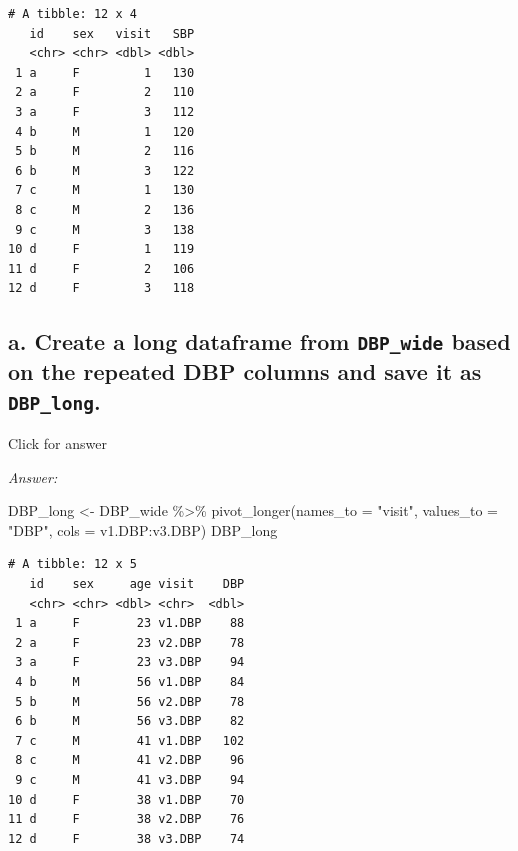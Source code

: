 \documentclass[
]{book}
\newenvironment{Shaded}{\begin{snugshade}}{\end{snugshade}}
\newcommand{\AttributeTok}[1]{\textcolor[rgb]{0.77,0.63,0.00}{#1}}
\newcommand{\FunctionTok}[1]{\textcolor[rgb]{0.00,0.00,0.00}{#1}}
\newcommand{\NormalTok}[1]{#1}
\newcommand{\OtherTok}[1]{\textcolor[rgb]{0.56,0.35,0.01}{#1}}
\newcommand{\SpecialCharTok}[1]{\textcolor[rgb]{0.00,0.00,0.00}{#1}}
\newcommand{\StringTok}[1]{\textcolor[rgb]{0.31,0.60,0.02}{#1}}
\begin{document}
\begin{verbatim}
# A tibble: 12 x 4
   id    sex   visit   SBP
   <chr> <chr> <dbl> <dbl>
 1 a     F         1   130
 2 a     F         2   110
 3 a     F         3   112
 4 b     M         1   120
 5 b     M         2   116
 6 b     M         3   122
 7 c     M         1   130
 8 c     M         2   136
 9 c     M         3   138
10 d     F         1   119
11 d     F         2   106
12 d     F         3   118
\end{verbatim}

\hypertarget{a.-create-a-long-dataframe-from-dbp_wide-based-on-the-repeated-dbp-columns-and-save-it-as-dbp_long.}{%
\subsection{\texorpdfstring{a. Create a long dataframe from \texttt{DBP\_wide} based on the repeated DBP columns and save it as \texttt{DBP\_long}.}{a. Create a long dataframe from DBP\_wide based on the repeated DBP columns and save it as DBP\_long.}}\label{a.-create-a-long-dataframe-from-dbp_wide-based-on-the-repeated-dbp-columns-and-save-it-as-dbp_long.}}

Click for answer

\emph{Answer:}

\begin{Shaded}
\begin{Highlighting}[]
\NormalTok{DBP\_long }\OtherTok{\textless{}{-}}\NormalTok{ DBP\_wide }\SpecialCharTok{\%\textgreater{}\%}
  \FunctionTok{pivot\_longer}\NormalTok{(}\AttributeTok{names\_to =} \StringTok{"visit"}\NormalTok{,}
               \AttributeTok{values\_to =} \StringTok{"DBP"}\NormalTok{,}
               \AttributeTok{cols =}\NormalTok{ v1.DBP}\SpecialCharTok{:}\NormalTok{v3.DBP)}
\NormalTok{DBP\_long}
\end{Highlighting}
\end{Shaded}

\begin{verbatim}
# A tibble: 12 x 5
   id    sex     age visit    DBP
   <chr> <chr> <dbl> <chr>  <dbl>
 1 a     F        23 v1.DBP    88
 2 a     F        23 v2.DBP    78
 3 a     F        23 v3.DBP    94
 4 b     M        56 v1.DBP    84
 5 b     M        56 v2.DBP    78
 6 b     M        56 v3.DBP    82
 7 c     M        41 v1.DBP   102
 8 c     M        41 v2.DBP    96
 9 c     M        41 v3.DBP    94
10 d     F        38 v1.DBP    70
11 d     F        38 v2.DBP    76
12 d     F        38 v3.DBP    74
\end{verbatim}
\end{document}
